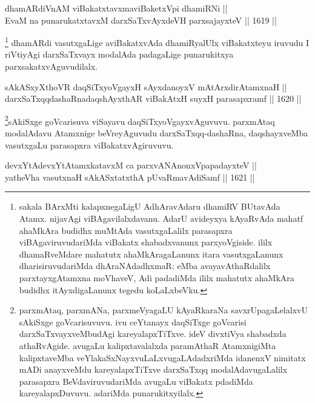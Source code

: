 
\begin{shl}
dhamARdiVnAM viBakatxtavxmaviBaketxV\s pi dhamiRNi || \\
EvaM na punarukatxtavxM darxSaTxvAyxdeVH parxsajayxteV \hfill || 1619 ||  
\end{shl}

\begin{artha}
\footnote{sakala BArxMti kalapxnegaLigU AdhAravAdaru dhamiRV BUtavAda Atamx. nijavAgi viBAgavilalxdavanu. AdarU avideyxya kAyaRvAda mahatf ahaMkAra budidhx muMtAda vasutxgaLalilx parasapxra viBAgaviruvudariMda viBakatx shabadxvanunx parxyoVgiside. ililx dhamaRveMdare mahatutx ahaMkAragaLanunx itara vasutxgaLanunx dharisiruvudariMda dhAraNAdadhxmaR: eMba avayavAthaRdalilx parxtayxgAtamxna moVhaveV, Adi padadiMda ililx mahatutx ahaMkAra budidhx itAyxdigaLanunx tegedu koLaLxbeVku.}
dhamARdi vasutxgaLige aviBakatxvAda dhamiRyalUlx viBakatxteyu iruvudu I riVtiyAgi darxSaTxvayx modalAda padagaLige punarukitxya parxsakatxvAguvudilalx.
\end{artha}


\begin{shl}
sAkASxyXthoVR daqSiTxyoVgayxH sAyxdanoyxV mAtArxdirAtamxnaH || \\
darxSaTxqqdashaRnadaqshAyxthAR viBakAtxH suyxH parasapxramf \hfill || 1620 ||  
\end{shl}

\begin{artha}
\footnote{parxmAtaq, parxmANa, parxmeVyagaLU kAyaRkaraNa savxrUpagaLelalxvU sAkiSxge goVcarisuvuvu. ivu ceYtanayx daqSiTxge goVcarisi darxSaTxvayxveMbudAgi kareyalapxTiTxve. ideV divxtiVya shabadxda athaRvAgide. avugaLu kalipxtavalalxda paramAthaR AtamxnigiMta kalipxtaveMba veYlakaSxNayxvuLaLxvugaLAdadxriMda idanenxV nimitatx mADi anayxveMdu kareyalapxTiTxve darxSaTxqq modalAdavugaLalilx parasapxra BeVdaviruvudariMda avugaLu viBakatx pdadiMda kareyalapxDuvuvu. adariMda punarukitxyilalx.}sAkiSxge goVcarisuva viSayavu daqSiTxyoVgayxvAguvuvu. parxmAtaq modalAdavu Atamxnige beVreyAguvudu darxSaTxqq-dashaRna, daqshayxveMba vasutxgaLu parasapxra viBakatxvAgiruvuvu.
\end{artha}


\begin{shl}
devxYtAdevxYtAtamxkatavxM ca parxvANAnonxVpapadayxteV || \\
yatheVha vasutxnaH sAkASxtatxthA pUvaRmavAdiSamf \hfill || 1621 ||  
\end{shl}

